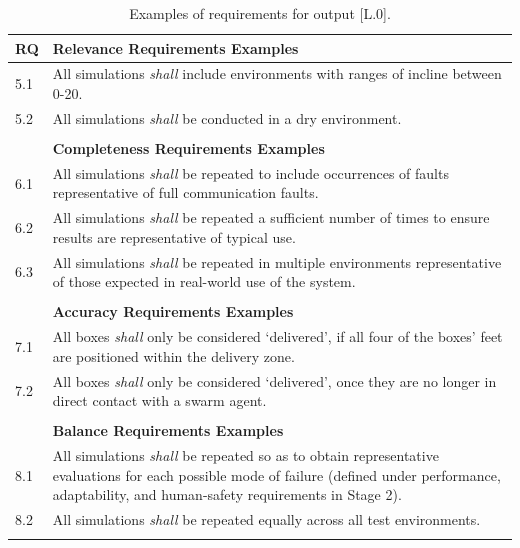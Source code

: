\documentclass[runningheads]{llncs}
\begin{document}
\begin{table}[!h]%
	\centering
	\begin{tabular}{p{0.6cm} p{11.6cm}}
		\textbf{RQ} & \textbf{Relevance Requirements Examples} \\
		\hline
		5.1 & All simulations \emph{shall} include environments with ranges of incline between 0-20\textdegree.\\
		\hline
		5.2 & All simulations \emph{shall} be conducted in a dry environment.\\
		\hline \\[-1.25\medskipamount]
		& \textbf{Completeness Requirements Examples} \\
		\hline
		6.1 & All simulations \emph{shall} be repeated to include occurrences of faults representative of full communication faults.\\
		\hline
		6.2 & All simulations \emph{shall} be repeated a sufficient number of times to ensure results are representative of typical use.\\
		\hline
		6.3 & All simulations \emph{shall} be repeated in multiple environments representative of those expected in real-world use of the system.\\
		\hline \\[-1.25\medskipamount]
		& \textbf{Accuracy Requirements Examples} \\
		\hline
		7.1 & All boxes \emph{shall} only be considered `delivered’, if all four of the boxes’ feet are positioned within the delivery zone.\\
		\hline
		7.2 & All boxes \emph{shall} only be considered `delivered’, once they are no longer in direct contact with a swarm agent.\\
		\hline \\[-1.25\medskipamount]
		& \textbf{Balance Requirements Examples} \\
		\hline
		8.1 & All simulations \emph{shall} be repeated so as to obtain representative evaluations for each possible mode of failure (defined under performance, adaptability, and human-safety requirements in Stage 2).\\
		\hline
		8.2 & All simulations \emph{shall} be repeated equally across all test environments.\\
		\hline \\[-1\medskipamount] %
	\end{tabular}
	\caption{Examples of requirements for output [L.0].}
	\label{tab:L0_req}
	\vspace{-4ex}
\end{table}
\end{document}
